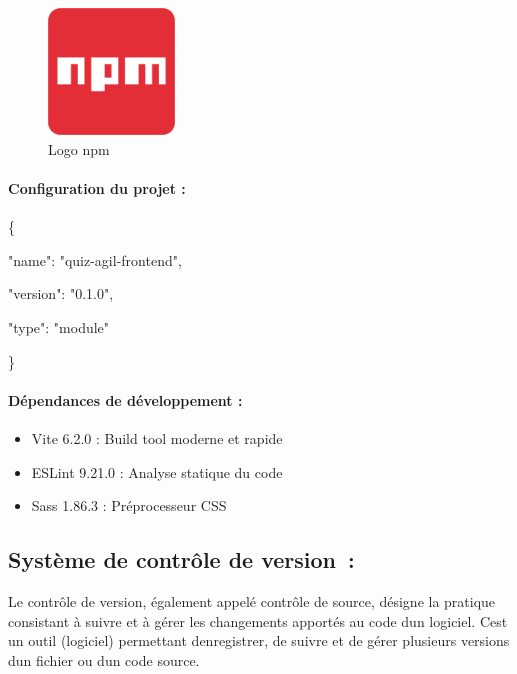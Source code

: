 \documentclass[12pt,a4paper,twoside]{report}
\begin{document}
\begin{figure}[H]
\centering
\includegraphics[width=0.3\textwidth]{latex_media/media/image28.png}
\caption{Logo npm}
\label{fig:logo-npm}
\end{figure}

\hypertarget{configuration-du-projet-1}{%
\paragraph{Configuration du projet :}\label{configuration-du-projet-1}}

\{

"name": "quiz-agil-frontend",

"version": "0.1.0",

"type": "module"

\}

\hypertarget{duxe9pendances-de-duxe9veloppement}{%
\paragraph{\texorpdfstring{\textbf{Dépendances de développement
:}}{Dépendances de développement :}}\label{duxe9pendances-de-duxe9veloppement}}

\begin{itemize}
\item
  Vite 6.2.0 : Build tool moderne et rapide
\item
  ESLint 9.21.0 : Analyse statique du code
\item
  Sass 1.86.3 : Préprocesseur CSS
\end{itemize}

\hypertarget{systuxe8me-de-contruxf4le-de-version}{%
\subsection{Système de contrôle de
version~:}\label{systuxe8me-de-contruxf4le-de-version}}

Le contrôle de version, également appelé contrôle de source, désigne la
pratique consistant à suivre et à gérer les changements apportés au code
d\textquotesingle un logiciel. C\textquotesingle est un outil (logiciel)
permettant d\textquotesingle enregistrer, de suivre et de gérer
plusieurs versions d\textquotesingle un fichier ou d\textquotesingle un
code source.
\end{document}
